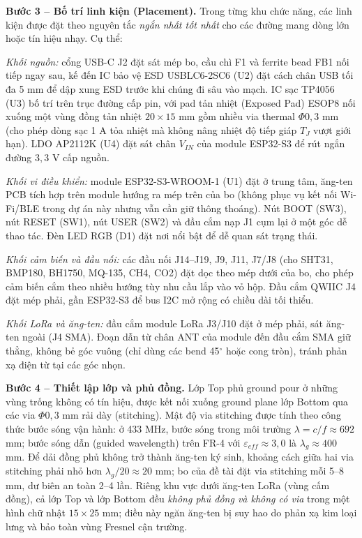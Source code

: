 \textbf{Bước 3 -- Bố trí linh kiện (Placement).} Trong từng khu chức năng, các linh kiện được đặt theo nguyên tắc \emph{ngắn nhất tốt nhất} cho các đường mang dòng lớn hoặc tín hiệu nhạy. Cụ thể:

\textit{Khối nguồn:} cổng USB-C J2 đặt sát mép bo, cầu chì F1 và ferrite bead FB1 nối tiếp ngay sau, kế đến IC bảo vệ ESD USBLC6-2SC6 (U2) đặt cách chân USB tối đa 5 mm để dập xung ESD trước khi chúng đi sâu vào mạch. IC sạc TP4056 (U3) bố trí trên trục đường cấp pin, với pad tản nhiệt (Exposed Pad) ESOP8 nối xuống một vùng đồng tản nhiệt $20\times15$ mm gồm nhiều via thermal $\Phi 0{,}3$ mm (cho phép dòng sạc 1 A tỏa nhiệt mà không nâng nhiệt độ tiếp giáp $T_J$ vượt giới hạn). LDO AP2112K (U4) đặt sát chân $V_{IN}$ của module ESP32-S3 để rút ngắn đường $3{,}3$ V cấp nguồn.

\textit{Khối vi điều khiển:} module ESP32-S3-WROOM-1 (U1) đặt ở trung tâm, ăng-ten PCB tích hợp trên module hướng ra mép trên của bo (không phục vụ kết nối Wi-Fi/BLE trong dự án này nhưng vẫn cần giữ thông thoáng). Nút BOOT (SW3), nút RESET (SW1), nút USER (SW2) và đầu cắm nạp J1 cụm lại ở một góc dễ thao tác. Đèn LED RGB (D1) đặt nơi nổi bật để dễ quan sát trạng thái.

\textit{Khối cảm biến và đầu nối:} các đầu nối J14--J19, J9, J11, J7/J8 (cho SHT31, BMP180, BH1750, MQ-135, CH4, CO2) đặt dọc theo mép dưới của bo, cho phép cảm biến cắm theo nhiều hướng tùy nhu cầu lắp vào vỏ hộp. Đầu cắm QWIIC J4 đặt mép phải, gần ESP32-S3 để bus I2C mở rộng có chiều dài tối thiểu.

\textit{Khối LoRa và ăng-ten:} đầu cắm module LoRa J3/J10 đặt ở mép phải, sát ăng-ten ngoài (J4 SMA). Đoạn dẫn từ chân ANT của module đến đầu cắm SMA giữ thẳng, không bẻ góc vuông (chỉ dùng các bend 45$^\circ$ hoặc cong tròn), tránh phản xạ điện từ tại các góc nhọn.

\textbf{Bước 4 -- Thiết lập lớp và phủ đồng.} Lớp Top phủ ground pour ở những vùng trống không có tín hiệu, được kết nối xuống ground plane lớp Bottom qua các via $\Phi 0{,}3$ mm rải dày (stitching). Mật độ via stitching được tính theo công thức bước sóng vận hành: ở 433 MHz, bước sóng trong môi trường $\lambda = c/f \approx 692$ mm; bước sóng dẫn (guided wavelength) trên FR-4 với $\varepsilon_{eff}\approx 3{,}0$ là $\lambda_g \approx 400$ mm. Để dải đồng phủ không trở thành ăng-ten ký sinh, khoảng cách giữa hai via stitching phải nhỏ hơn $\lambda_g/20 \approx 20$ mm; bo của đề tài đặt via stitching mỗi 5--8 mm, dư biên an toàn 2--4 lần. Riêng khu vực dưới ăng-ten LoRa (vùng cấm đồng), cả lớp Top và lớp Bottom đều \emph{không phủ đồng và không có via} trong một hình chữ nhật $15 \times 25$ mm; điều này ngăn ăng-ten bị suy hao do phản xạ kim loại lưng và bảo toàn vùng Fresnel cận trường.

